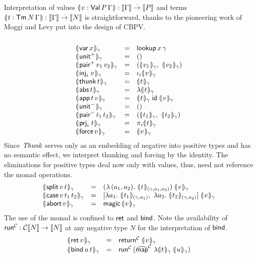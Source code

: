 \documentclass[sigplan,screen,fleqn]{acmart}
\begin{document}
Interpretation of values
$\denty{ v : \PValTm P \Gamma } : \den \Gamma \todot \den P$
and terms
$\denty{ t : \Tm N \Gamma } : \den \Gamma \todot \den N$
is straightforward, thanks to the pioneering work of
Moggi \cite{moggi:infcomp91} and
Levy \cite{levy:hosc06}
put into the design of CBPV.
\[
\begin{array}{lcl}
  \\
  \dent{\tvar\,x}\gamma & = & \tlookup\,x\,\gamma \\
  \dent{\punit}\gamma   & = & \ttempty \\
  \dent{\ppair\,v_1\,v_2}\gamma & = &
    (\dent{v_1}\gamma,\ \dent{v_2}\gamma) \\
  \dent{\inj i v}\gamma & = & \iota_i \dent v \gamma \\
  \dent{\tthunk\,t}\gamma & = & \dent t \gamma \\
  \dent{\tabs\,t}\gamma
      & = & \fdent t \gamma \\
  \dent{\tapp\,t\,v} \gamma & = &
     \dent t \gamma\;\tid\;\dent v \gamma \\
  \dent{\nunit}\gamma & = & \ttempty \\
  \dent{\npair\,t_1\,t_2}\gamma & = &
    (\dent{t_1}\gamma,\ \dent{t_2}\gamma) \\
  \dent{\prj i t}\gamma & = & \pi_i \dent t \gamma \\
  \dent{\tforce\,v}\gamma & = & \dent v \gamma \\
\end{array}
\]
Since $\tThunk$ serves only as an embedding of negative into positive
types and has no semantic effect,
we interpret thunking and forcing by the identity.
The eliminations for positive types deal now only with values, thus,
need not reference the monad operations.
\[
\begin{array}{lcl}
  \dent{\tsplit\,v\,t}\gamma & = & (\lambda\,(a_1,a_2).\
    \dent{t}{(\gamma,a_1,a_2)} ) \; \dent v \gamma \\
  \dent{\tcase\,v\,t_1\,t_2}\gamma & = &
    [  \lambda a_1.\ \dent{t_1}{(\gamma,a_1)}
    ,\ \lambda a_2.\ \dent{t_2}{(\gamma,a_2)}
    ]\; \dent v \gamma \\
  \dent{\tabort\,v}\gamma & = & \tmagic\,\dent v \gamma \\
\end{array}
\]
The use of the monad is confined to $\tret$ and $\tbind$.
Note the availability of $\trun^\C : \C \den N \to \den N$
at any negative type $N$ for the interpretation of $\tbind$.
\[
\begin{array}{lcl}
  \dent{\tret\,v}\gamma & = & \treturn[\C] \; \dent v \gamma \\
  \dent{\tbind\,u\,t}\gamma & = & \trun^\C\,
    (\stmap[\C] \; \fdent t \gamma\; \dent u \gamma) \\
\end{array}
\]
\end{document}
